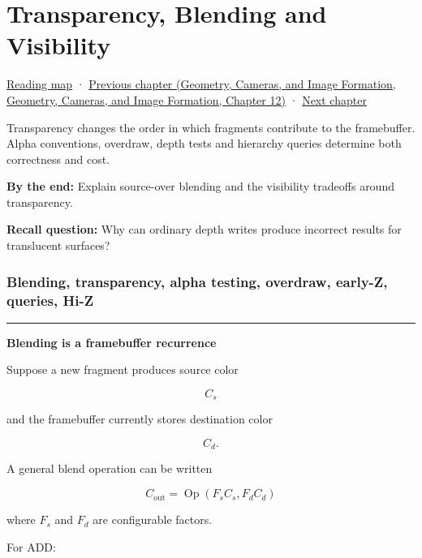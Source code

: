 \hypertarget{03-visual-computing-i-ch014}{}
\chapter{Transparency, Blending and Visibility}\label{stagechapter:03-visual-computing-i-ch014}\label{03-visual-computing-i-ch014-transparency-blending-and-visibility}

\hyperref[volume-reading-map]{Reading map} · \href{../03-Geometry-Cameras-and-Image-Formation/main.pdf\#nameddest=03-visual-computing-i-ch013-from-view-space-to-clip-space}{Previous chapter (Geometry, Cameras, and Image Formation, Geometry, Cameras, and Image Formation, Chapter 12)} · \hyperref[03-visual-computing-i-ch015-rasterization-foundations-and-renderer-evidence]{Next chapter}

Transparency changes the order in which fragments contribute to the framebuffer. Alpha conventions, overdraw, depth tests and hierarchy queries determine both correctness and cost.

\textbf{By the end:} Explain source-over blending and the visibility tradeoffs around transparency.

\textbf{Recall question:} Why can ordinary depth writes produce incorrect results for translucent surfaces?

\subsection{Blending, transparency, alpha testing, overdraw, early-Z, queries, Hi-Z}\label{03-visual-computing-i-ch014-blending-transparency-alpha-testing-overdraw-early-z-queries-hi-z}

\begin{center}\rule{0.5\linewidth}{0.5pt}\end{center}

\textbf{Blending is a framebuffer recurrence}

Suppose a new fragment produces source color

\[
C_s
\]

and the framebuffer currently stores destination color

\[
C_d.
\]

A general blend operation can be written

\[
\boxed{
C_{\text{out}}
=
\operatorname{Op}
\left(
F_s C_s,
F_d C_d
\right)
}
\]

where \(F_s\) and \(F_d\) are configurable factors.

For ADD:

